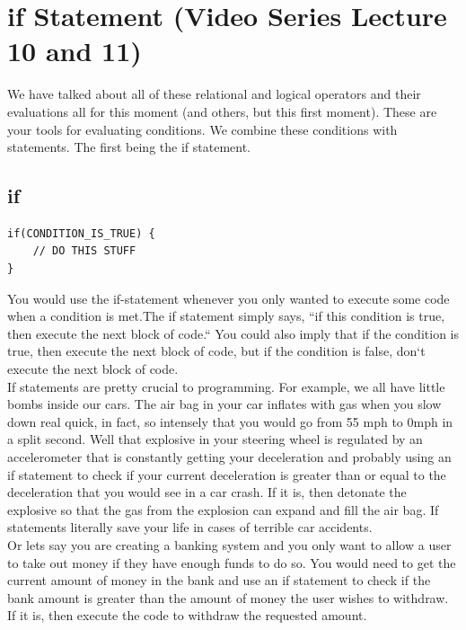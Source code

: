 \documentclass[11]{article}
\begin{document}
\section{if Statement (Video Series Lecture 10 and 11)}
We have talked about all of these relational and logical operators and their evaluations all for this moment (and others, but this first moment). These are your tools for evaluating conditions. We combine these conditions with statements. The first being the if statement.\\
\subsection{if}
\begin{lstlisting}
if(CONDITION_IS_TRUE) {
    // DO THIS STUFF
}
\end{lstlisting}

You would use the if-statement whenever you only wanted to execute some code when a condition is met.The if statement simply says, ``if this condition is true, then execute the next block of code.`` You could also imply that if the condition is true, then execute the next block of code, but if the condition is false, don`t execute the next block of code.\\

If statements are pretty crucial to programming. For example, we all have little bombs inside our cars. The air bag in your car inflates with gas when you slow down real quick, in fact, so intensely that you would go from 55 mph to 0mph in a split second. Well that explosive in your steering wheel is regulated by an accelerometer that is constantly getting your deceleration and probably using an if statement to check if your current deceleration is greater than or equal to the deceleration that you would see in a car crash. If it is, then detonate the explosive so that the gas from the explosion can expand and fill the air bag. If statements literally save your life in cases of terrible car accidents.\\

Or lets say you are creating a banking system and you only want to allow a user to take out money if they have enough funds to do so. You would need to get the current amount of money in the bank and use an if statement to check if the bank amount is greater than the amount of money the user wishes to withdraw. If it is, then execute the code to withdraw the requested amount.\\
\end{document}
